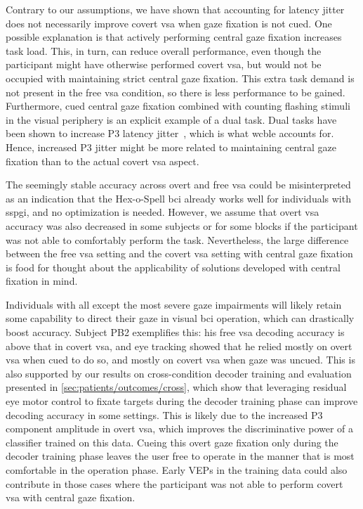 \documentclass{article}
\begin{document}
Contrary to our assumptions, we have shown that accounting for latency jitter does not
necessarily improve covert \ac{vsa} when gaze fixation is not cued.
One possible explanation is that actively performing central gaze fixation
increases task load.
This, in turn, can reduce overall performance, even though the participant might
have otherwise performed covert \ac{vsa}, but would not be occupied with
maintaining strict central gaze fixation.
This extra task demand is not present in the free \ac{vsa} condition, so
there is less performance to be gained.
Furthermore, cued central gaze fixation combined with counting flashing stimuli
in the visual periphery is an explicit example of a dual task.
Dual tasks have been shown to increase P3 latency
jitter~\cite{Polich2007,Arico2014, VanDenKerchove2024},
which is what \ac{wcble} accounts for.
Hence, increased P3 jitter might be more related to maintaining central gaze fixation
than to the actual covert \ac{vsa} aspect.

The seemingly stable accuracy across overt and free \ac{vsa} could be
misinterpreted as an indication that the Hex-o-Spell \ac{bci} already works
well for individuals with \ac{sspgi}, and no optimization is
needed.
However, we assume that overt \ac{vsa} accuracy was also decreased in some
subjects or for some blocks if the participant was not able to comfortably
perform the task.
Nevertheless, the large difference between the free \ac{vsa} setting and the
covert \ac{vsa} setting
with central gaze fixation is food for thought about the applicability of
solutions developed with central fixation in mind.

Individuals with all except the most severe gaze impairments will likely retain
some capability to direct their gaze in visual \ac{bci} operation, which can
drastically boost accuracy.
Subject PB2 exemplifies this: his free \ac{vsa} decoding accuracy is above that in covert
\ac{vsa}, and eye tracking showed that he relied mostly
on overt \ac{vsa} when cued to do so, and mostly on covert \ac{vsa} when
gaze was uncued.
This is also supported by our results on cross-condition decoder training and evaluation presented
in \cref{sec:patients/outcomes/cross}, which show that leveraging residual
eye motor control to fixate targets during the decoder training phase can improve
decoding accuracy in some settings.
This is likely due to the increased P3 component amplitude in overt \ac{vsa},
which improves the discriminative power of a classifier trained on this data.
Cueing this overt gaze fixation only during the decoder training phase leaves the user
free to operate in the manner that is most comfortable in the
operation phase.
Early VEPs in the training data could also contribute in those cases where the participant was not
able to perform covert \ac{vsa} with central gaze fixation.
\end{document}
